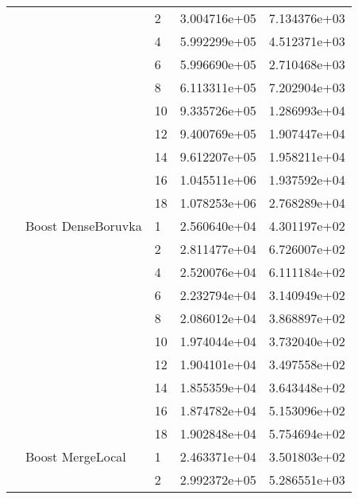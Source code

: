 \begin{tabular}{lllrr}
                      &                     & 2  &  3.004716e+05 &  7.134376e+03 \\
                      &                     & 4  &  5.992299e+05 &  4.512371e+03 \\
                      &                     & 6  &  5.996690e+05 &  2.710468e+03 \\
                      &                     & 8  &  6.113311e+05 &  7.202904e+03 \\
                      &                     & 10 &  9.335726e+05 &  1.286993e+04 \\
                      &                     & 12 &  9.400769e+05 &  1.907447e+04 \\
                      &                     & 14 &  9.612207e+05 &  1.958211e+04 \\
                      &                     & 16 &  1.045511e+06 &  1.937592e+04 \\
                      &                     & 18 &  1.078253e+06 &  2.768289e+04 \\
                      & Boost DenseBoruvka & 1  &  2.560640e+04 &  4.301197e+02 \\
                      &                     & 2  &  2.811477e+04 &  6.726007e+02 \\
                      &                     & 4  &  2.520076e+04 &  6.111184e+02 \\
                      &                     & 6  &  2.232794e+04 &  3.140949e+02 \\
                      &                     & 8  &  2.086012e+04 &  3.868897e+02 \\
                      &                     & 10 &  1.974044e+04 &  3.732040e+02 \\
                      &                     & 12 &  1.904101e+04 &  3.497558e+02 \\
                      &                     & 14 &  1.855359e+04 &  3.643448e+02 \\
                      &                     & 16 &  1.874782e+04 &  5.153096e+02 \\
                      &                     & 18 &  1.902848e+04 &  5.754694e+02 \\
                      & Boost MergeLocal & 1  &  2.463371e+04 &  3.501803e+02 \\
                      &                     & 2  &  2.992372e+05 &  5.286551e+03 \\

\end{tabular}
